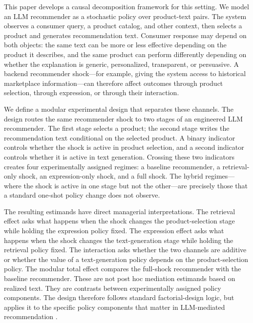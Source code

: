 \documentclass[11pt]{article}
\begin{document}
This paper develops a causal decomposition framework for this setting. We model an LLM recommender as a stochastic policy over product-text pairs. The system observes a consumer query, a product catalog, and other context, then selects a product and generates recommendation text. Consumer response may depend on both objects: the same text can be more or less effective depending on the product it describes, and the same product can perform differently depending on whether the explanation is generic, personalized, transparent, or persuasive. A backend recommender shock---for example, giving the system access to historical marketplace information---can therefore affect outcomes through product selection, through expression, or through their interaction.

We define a modular experimental design that separates these channels. The design routes the same recommender shock to two stages of an engineered LLM recommender. The first stage selects a product; the second stage writes the recommendation text conditional on the selected product. A binary indicator controls whether the shock is active in product selection, and a second indicator controls whether it is active in text generation. Crossing these two indicators creates four experimentally assigned regimes: a baseline recommender, a retrieval-only shock, an expression-only shock, and a full shock. The hybrid regimes---where the shock is active in one stage but not the other---are precisely those that a standard one-shot policy change does not observe.

The resulting estimands have direct managerial interpretations. The retrieval effect asks what happens when the shock changes the product-selection stage while holding the expression policy fixed. The expression effect asks what happens when the shock changes the text-generation stage while holding the retrieval policy fixed. The interaction asks whether the two channels are additive or whether the value of a text-generation policy depends on the product-selection policy. The modular total effect compares the full-shock recommender with the baseline recommender. These are not post hoc mediation estimands based on realized text. They are contrasts between experimentally assigned policy components. The design therefore follows standard factorial-design logic, but applies it to the specific policy components that matter in LLM-mediated recommendation \citep{egami2019causal, muralidharan2025factorial}.
\end{document}
